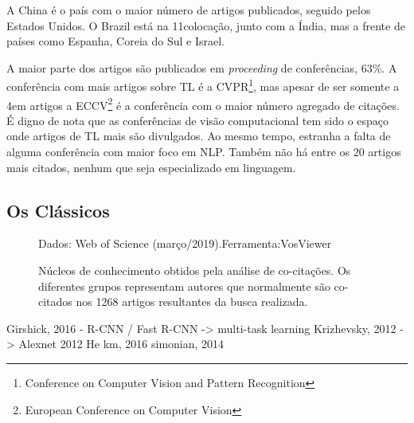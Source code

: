 \documentclass[sigconf]{acmart}
\newcommand{\source}[2]{\raggedleft{}\vspace*{-7mm}\caption*{ \textmd{\scriptsize{Dados: {#1}.\hfill Ferramenta:{#2}}}}}
\begin{document}
  A China é o país com o maior número de artigos publicados, seguido pelos Estados Unidos. O Brazil está na 11\textordfeminine colocação, junto com a Índia, mas a frente de países como Espanha, Coreia do Sul e Israel.

  A maior parte dos artigos são publicados em \emph{proceeding} de conferências, 63\%. A conferência com mais artigos sobre TL é a CVPR\footnote{Conference on Computer Vision and Pattern Recognition}, mas apesar de ser somente a 4\textordfeminine em artigos a ECCV\footnote{European Conference on Computer Vision} é a conferência com o maior número agregado de citações. É digno de nota que as conferências de visão computacional tem sido o espaço onde artigos de TL mais são divulgados. Ao mesmo tempo, estranha a falta de alguma conferência com maior foco em NLP. Também não há entre os 20 artigos mais citados, nenhum que seja especializado em linguagem.
  \subsection{Os Clássicos}\label{classicos}
  \begin{figure}[htp]
    \source{Web of Science (março/2019)}{VosViewer\protect{~\cite{VOSviewer}}}
    \caption{Núcleos de conhecimento obtidos pela análise de co-citações. Os diferentes grupos representam autores que normalmente são co-citados nos 1268 artigos resultantes da busca realizada.}
    \label{fig:classicos}
  \end{figure}



  Girshick, 2016 - R-CNN / Fast R-CNN -> multi-task learning
  Krizhevsky, 2012 -> Alexnet 2012
  He km, 2016
  simonian, 2014
\end{document}
